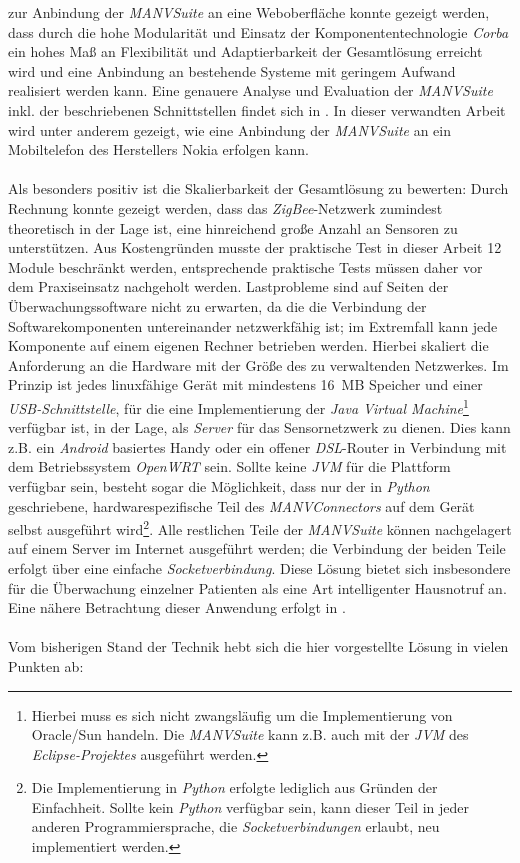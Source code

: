 zur Anbindung der \emph{MANVSuite} an eine Weboberfläche konnte gezeigt werden, dass durch die hohe Modularität
und Einsatz der Komponententechnologie \emph{Corba} ein hohes Maß an Flexibilität und Adaptierbarkeit der
Gesamtlösung erreicht wird und eine Anbindung an bestehende Systeme mit geringem Aufwand realisiert werden kann.
Eine genauere Analyse und Evaluation der \emph{MANVSuite} inkl. der beschriebenen Schnittstellen findet sich
in \cite{Jan}. In dieser verwandten Arbeit wird unter anderem gezeigt, wie eine Anbindung der \emph{MANVSuite}
an ein Mobiltelefon des Herstellers Nokia erfolgen kann.\\
\\
Als besonders positiv ist die Skalierbarkeit der Gesamtlösung zu bewerten: Durch Rechnung konnte gezeigt werden,
dass das \emph{ZigBee}-Netzwerk zumindest theoretisch in der Lage ist, eine hinreichend große Anzahl an Sensoren
zu unterstützen. Aus Kostengründen musste der praktische Test in dieser Arbeit 12 Module beschränkt werden, entsprechende
praktische Tests müssen daher vor dem Praxiseinsatz nachgeholt werden.
Lastprobleme sind auf Seiten der Überwachungssoftware nicht zu erwarten, da
die die Verbindung der Softwarekomponenten untereinander netzwerkfähig ist; im Extremfall kann jede
Komponente auf einem eigenen Rechner betrieben werden. Hierbei skaliert die Anforderung an die Hardware mit
der Größe des zu verwaltenden Netzwerkes. Im Prinzip ist jedes linuxfähige Gerät mit mindestens 16~MB Speicher
und einer \emph{USB-Schnittstelle}, für die eine Implementierung der \emph{Java Virtual Machine}\footnote{Hierbei muss
es sich nicht zwangsläufig um die Implementierung von Oracle/Sun handeln. Die \emph{MANVSuite} kann z.B. auch
mit der \emph{JVM} des \emph{Eclipse-Projektes} ausgeführt werden.} verfügbar ist, in der Lage, als \emph{Server}
für das Sensornetzwerk zu dienen. Dies kann z.B. ein \emph{Android} basiertes Handy oder ein offener
\emph{DSL}-Router in Verbindung mit dem Betriebssystem \emph{OpenWRT} sein. Sollte keine \emph{JVM} für die
Plattform verfügbar sein, besteht sogar die Möglichkeit, dass nur der in \emph{Python} geschriebene,
hardwarespezifische Teil des \emph{MANVConnectors} auf dem Gerät selbst ausgeführt wird\footnote{Die Implementierung
in \emph{Python} erfolgte lediglich aus Gründen der Einfachheit. Sollte kein \emph{Python} verfügbar sein,
kann dieser Teil in jeder anderen Programmiersprache, die \emph{Socketverbindungen} erlaubt, neu implementiert werden.}. 
Alle restlichen Teile der \emph{MANVSuite} können nachgelagert auf einem Server im Internet ausgeführt werden; 
die Verbindung der beiden Teile erfolgt über eine einfache \emph{Socketverbindung}. Diese Lösung bietet sich insbesondere 
für die Überwachung einzelner Patienten als eine Art intelligenter Hausnotruf an. Eine nähere Betrachtung dieser
Anwendung erfolgt in \cite{AAL}.
\\
\\
Vom bisherigen Stand der Technik hebt sich die hier vorgestellte Lösung in vielen Punkten ab:

